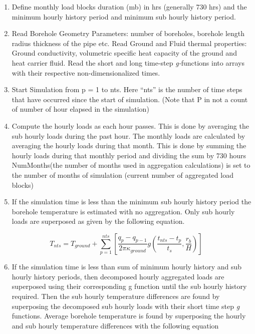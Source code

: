 \begin{enumerate}
\item Define monthly load blocks duration (mb) in hrs (generally 730 hrs) and the minimum hourly history period and minimum sub hourly history period.
\item Read Borehole Geometry Parameters: number of boreholes, borehole length radius thickness of the pipe etc. Read Ground and Fluid thermal properties: Ground conductivity, volumetric specific heat capacity of the ground and heat carrier fluid. Read the short and long time-step \emph{g-}functions into arrays with their respective non-dimensionalized times.
\item Start Simulation from p = 1 to nts. Here ``nts'' is the number of time steps that have occurred since the start of simulation. (Note that P in not a count of number of hour elapsed in the simulation)
\item Compute the hourly loads as each hour passes. This is done by averaging the sub hourly loads during the past hour. The monthly loads are calculated by averaging the hourly loads during that month. This is done by summing the hourly loads during that monthly period and dividing the sum by 730 hours NumMonths(the number of months used in aggregation calculations) is set to the number of months of simulation (current number of aggregated load blocks)
\item If the simulation time is less than the minimum sub hourly history period the borehole temperature is estimated with no aggregation. Only sub hourly loads are superposed as given by the following equation.
\end{enumerate}

\begin{equation}
{T_{nts}} = {T_{ground}} + \sum\limits_{p = 1}^{nts} {\left[ {\frac{{{q_p} - {q_{p - 1}}}}{{2\pi {\kappa_{ground}}}}g\left( {\frac{{{t_{nts}} - {t_p}}}{{{t_s}}},\frac{{{r_b}}}{H}} \right)} \right]}
\label{eq:Tnts605}
\end{equation}

\begin{enumerate}
\setcounter{enumi}{5}
\item If the simulation time is less than sum of minimum hourly history and sub hourly history periods, then decomposed hourly aggregated loads are superposed using their corresponding g function until the sub hourly history required. Then the sub hourly temperature differences are found by superposing the decomposed sub hourly loads with their short time step \emph{g} functions. Average borehole temperature is found by superposing the hourly and sub hourly temperature differences with the following equation
\end{enumerate}

